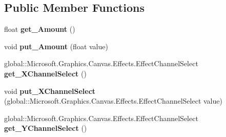 \subsection*{Public Member Functions}
\begin{DoxyCompactItemize}
\item 
\mbox{\label{interface_microsoft_1_1_graphics_1_1_canvas_1_1_effects_1_1_i_displacement_map_effect_a7aebbe3771b9e29fcf061b4a886e6364}} 
float {\bfseries get\+\_\+\+Amount} ()
\item 
\mbox{\label{interface_microsoft_1_1_graphics_1_1_canvas_1_1_effects_1_1_i_displacement_map_effect_a047ea38a52db6d5b2bc8f9a69edc8c1f}} 
void {\bfseries put\+\_\+\+Amount} (float value)
\item 
\mbox{\label{interface_microsoft_1_1_graphics_1_1_canvas_1_1_effects_1_1_i_displacement_map_effect_aae337ddbef97551a32257022a3fa66a9}} 
global\+::\+Microsoft.\+Graphics.\+Canvas.\+Effects.\+Effect\+Channel\+Select {\bfseries get\+\_\+\+X\+Channel\+Select} ()
\item 
\mbox{\label{interface_microsoft_1_1_graphics_1_1_canvas_1_1_effects_1_1_i_displacement_map_effect_abe51385c67bec880ea3db9f871d8a0b1}} 
void {\bfseries put\+\_\+\+X\+Channel\+Select} (global\+::\+Microsoft.\+Graphics.\+Canvas.\+Effects.\+Effect\+Channel\+Select value)
\item 
\mbox{\label{interface_microsoft_1_1_graphics_1_1_canvas_1_1_effects_1_1_i_displacement_map_effect_afdb278b27ceb0bcc8d4f160ecadfb370}} 
global\+::\+Microsoft.\+Graphics.\+Canvas.\+Effects.\+Effect\+Channel\+Select {\bfseries get\+\_\+\+Y\+Channel\+Select} ()
\item 
\mbox{\label{interface_microsoft_1_1_graphics_1_1_canvas_1_1_effects_1_1_i_displacement_map_effect_a21fd084ca58eb6bb042e123fb75cf549}} 

\end{DoxyCompactItemize}
